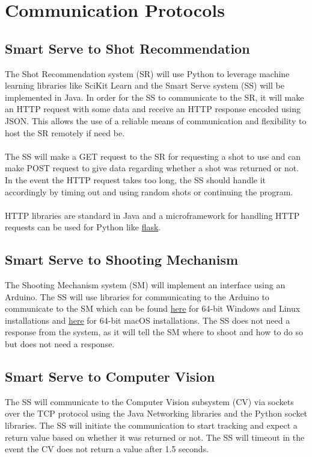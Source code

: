 \documentclass[11pt]{article}
\begin{document}
\section{Communication Protocols} %
\subsection{Smart Serve to Shot Recommendation}
The Shot Recommendation system (SR) will use Python to leverage machine learning libraries like SciKit Learn and the Smart Serve system (SS) will be implemented in Java. In order for the SS to communicate to the SR, it will make an HTTP request with some data and receive an HTTP response encoded using JSON. This allows the use of a reliable means of communication and flexibility to host the SR remotely if need be. \\ \\
The SS will make a GET request to the SR for requesting a shot to use and can make POST request to give data regarding whether a shot was returned or not. In the event the HTTP request takes too long, the SS should handle it accordingly by timing out and using random shots or continuing the program. \\ \\
HTTP libraries are standard in Java and a microframework for handling HTTP requests can be used for Python like \href{http://flask.pocoo.org}{flask}.
\subsection{Smart Serve to Shooting Mechanism}
The Shooting Mechanism system (SM) will implement an interface using an Arduino. The SS will use libraries for communicating to the Arduino to communicate to the SM which can be found \href{http://fizzed.com/oss/rxtx-for-java}{here} for 64-bit Windows and Linux installations and \href{http://blog.iharder.net/2009/08/18/rxtx-java-6-and-librxtxserial-jnilib-on-intel-mac-os-x/}{here} for 64-bit macOS installations. The SS does not need a response from the system, as it will tell the SM where to shoot and how to do so but does not need a response.
\subsection{Smart Serve to Computer Vision}
The SS will communicate to the Computer Vision subsystem (CV) via sockets over the TCP protocol using the Java Networking libraries and the Python socket libraries. The SS will initiate the communication to start tracking and expect a return value based on whether it was returned or not. The SS will timeout in the event the CV does not return a value after 1.5 seconds.
\end{document}

